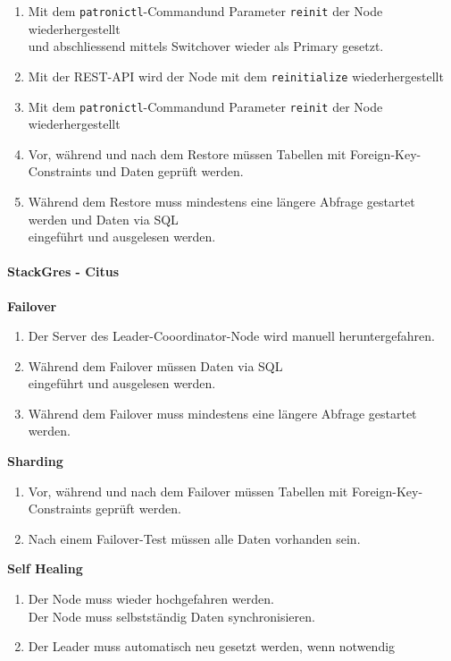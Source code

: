 \begin{flushleft}
\begin{description}
\begin{enumerate}[resume]
            \item Mit dem \texttt{patronictl}-Commandund Parameter \texttt{reinit} der Node wiederhergestellt\\und abschliessend mittels Switchover wieder als Primary gesetzt.
            \item Mit der REST-API wird der Node mit dem \texttt{reinitialize} wiederhergestellt
            \item Mit dem \texttt{patronictl}-Commandund Parameter \texttt{reinit} der Node wiederhergestellt
            \item Vor, während und nach dem Restore müssen Tabellen mit Foreign-Key-Constraints und Daten geprüft werden.
            \item Während dem Restore muss mindestens eine längere Abfrage gestartet werden und Daten via SQL\\eingeführt und ausgelesen werden.
        \end{enumerate}
    \end{description}
    \paragraph{StackGres - Citus}
    \begin{description}
        \item \textbf{Failover}\hfill \\
        \begin{enumerate}
            \item Der Server des Leader-Cooordinator-Node wird manuell heruntergefahren.
            \item Während dem Failover müssen Daten via SQL\\eingeführt und ausgelesen werden.
            \item Während dem Failover muss mindestens eine längere Abfrage gestartet werden.
        \end{enumerate}
        \item \textbf{Sharding}\hfill \\
        \begin{enumerate}[resume]
            \item Vor, während und nach dem Failover müssen Tabellen mit Foreign-Key-Constraints geprüft werden.
            \item Nach einem Failover-Test müssen alle Daten vorhanden sein.
        \end{enumerate}
        \item \textbf{Self Healing}\hfill \\
        \begin{enumerate}[resume]
            \item Der Node muss wieder hochgefahren werden.\\Der Node muss selbstständig Daten synchronisieren.
            \item Der Leader muss automatisch neu gesetzt werden, wenn notwendig
        \end{enumerate}
    \end{description}

\end{flushleft}
